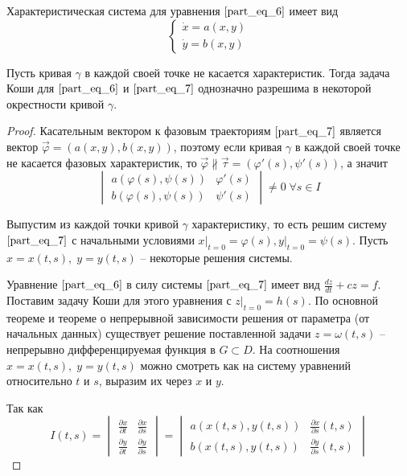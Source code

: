 Характеристическая система для уравнения $\eqref{part_eq_6}$ имеет вид
\begin{equation}
    \begin{cases}
        \dot{x} = a(x, y) \\
        \dot{y} = b(x, y)
    \end{cases}
    \label{part_eq_7}
\end{equation}

\begin{theorem}
    Пусть кривая $\gamma$ в каждой своей точке не касается характеристик. Тогда задача Коши для $\eqref{part_eq_6}$ и $\eqref{part_eq_7}$ однозначно разрешима в некоторой окрестности кривой $\gamma$.
\end{theorem}
\begin{proof}
	Касательным вектором к фазовым траекториям $\eqref{part_eq_7}$ является вектор $\vec{\varphi} = \left( a(x, y), b(x, y) \right)$, поэтому если кривая $\gamma$ в каждой своей точке не касается фазовых характеристик, то $\vec{\varphi} \nparallel \vec{\tau} = (\varphi'(s), \psi'(s))$, а значит
	\begin{equation}
		\begin{vmatrix}
			a(\varphi(s), \psi(s)) & \varphi'(s) \\
			b(\varphi(s), \psi(s)) & \psi'(s)
		\end{vmatrix} \neq 0\; \forall s \in I
		\label{part_eq_8}
	\end{equation}
	
	Выпустим из каждой точки кривой $\gamma$ характеристику, то есть решим систему $\eqref{part_eq_7}$ с начальными условиями $x \big|_{t = 0} = \varphi(s), y \big|_{t = 0} = \psi(s)$. Пусть $x = x(t, s), \; y = y(t, s)$ -- некоторые решения системы.
	
	Уравнение $\eqref{part_eq_6}$ в силу системы $\eqref{part_eq_7}$ имеет вид $\frac{dz}{dt} + cz = f$. Поставим задачу Коши для этого уравнения с $z \big|_{t = 0} = h(s)$. По основной теореме и теореме о непрерывной зависимости решения от параметра (от начальных данных) существует решение поставленной задачи $z = \omega (t, s)$ -- непрерывно дифференцируемая функция в $G \subset D$. На соотношения $x = x(t, s), \; y = y(t, s)$ можно смотреть как на систему уравнений относительно $t$ и $s$, выразим их через $x$ и $y$.

    Так как
    \begin{equation*}
        I(t, s) =
        \begin{vmatrix}
            \frac{\partial x}{\partial t} & \frac{\partial x}{\partial s} \\
            \frac{\partial y}{\partial t} & \frac{\partial y}{\partial s}
        \end{vmatrix} =
        \begin{vmatrix}
            a(x(t, s), y(t, s)) & \frac{\partial x}{\partial s}(t, s) \\
            b(x(t, s), y(t, s)) & \frac{\partial y}{\partial s}(t, s)
        \end{vmatrix}
    \end{equation*}


\end{proof}

